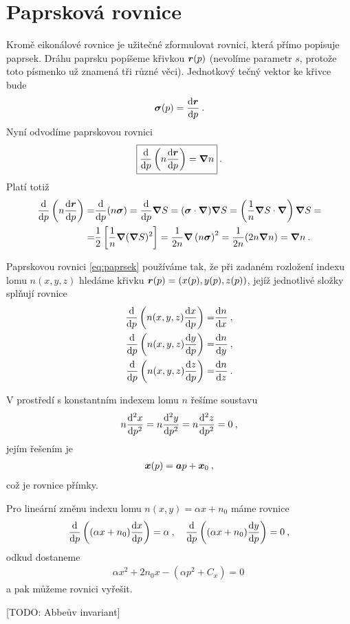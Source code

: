 \section{Paprsková rovnice}

Kromě eikonálové rovnice je užitečné zformulovat rovnici, která přímo popisuje paprsek. Dráhu paprsku popíšeme křivkou $\boldsymbol{r}(p)$ (nevolíme parametr $s$, protože toto písmenko už znamená tři různé věci). Jednotkový tečný vektor ke křivce bude \begin{align}
    \boldsymbol{\sigma}(p) = \dfrac{\mathrm{d}\boldsymbol{r}}{\mathrm{d}p} \:.
\end{align}
Nyní odvodíme paprskovou rovnici
\begin{align}
    \boxed{
    \dfrac{\mathrm{d}}{\mathrm{d}p} \left( n \dfrac{\mathrm{d}\boldsymbol{r}}{\mathrm{d}p}\right)  = \boldsymbol{\nabla} n 
    }\:. \label{eq:paprsek}
\end{align}
Platí totiž
\begin{align}
    \dfrac{\mathrm{d}}{\mathrm{d}p} \left( n \dfrac{\mathrm{d}\boldsymbol{r}}{\mathrm{d}p}\right) 
    =&
    \dfrac{\mathrm{d}}{\mathrm{d}p} (n \boldsymbol{\sigma}) 
    =
    \dfrac{\mathrm{d}}{\mathrm{d}p} \boldsymbol{\nabla} S 
    =
    (\boldsymbol{\sigma} \cdot \boldsymbol{\nabla} ) \boldsymbol{\nabla} S 
    = 
    \left( \frac{1}{n} \boldsymbol{\nabla} S \cdot \boldsymbol{\nabla} \right) \boldsymbol{\nabla} S 
    =\\ =&
    \dfrac{1}{2} \left[ \frac{1}{n} \boldsymbol{\nabla} (\boldsymbol{\nabla} S)^2 \right] 
    =
    \frac{1}{2 n} \boldsymbol{\nabla} \left( n \boldsymbol{\sigma} \right)^2 
    =
    \frac{1}{2n} (2 n \boldsymbol{\nabla} n)= \boldsymbol{\nabla} n \:.
\end{align}

Paprskovou rovnici \eqref{eq:paprsek} používáme tak, že při zadaném rozložení indexu lomu $n(x,y,z)$ hledáme křivku $\boldsymbol{r}(p) = \left( x(p), y(p), z(p) \right)$, jejíž jednotlivé složky splňují rovnice \begin{align}
    \dfrac{\mathrm{d}}{\mathrm{d}p} \left( n(x,y,z) \dfrac{\mathrm{d}x}{\mathrm{d}p} \right) =& \dfrac{\mathrm{d}n}{\mathrm{d}x} \:, \\
    \dfrac{\mathrm{d}}{\mathrm{d}p} \left( n(x,y,z) \dfrac{\mathrm{d}y}{\mathrm{d}p} \right) =& \dfrac{\mathrm{d}n}{\mathrm{d}y} \:, \\
    \dfrac{\mathrm{d}}{\mathrm{d}p} \left( n(x,y,z) \dfrac{\mathrm{d}z}{\mathrm{d}p} \right) =& \dfrac{\mathrm{d}n}{\mathrm{d}z} \:.
\end{align}

\begin{example}
V prostředí s konstantním indexem lomu $n$ řešíme soustavu \begin{align}
    n \dfrac{\mathrm{d}^2 x}{\mathrm{d}p^2} = n \dfrac{\mathrm{d}^2 y}{\mathrm{d}p^2} = n \dfrac{\mathrm{d}^2 z}{\mathrm{d}p^2} = 0 \:, 
\end{align}
jejím řešením je \begin{align}
    \boldsymbol{x}(p) = \boldsymbol{a} p + \boldsymbol{x}_0 \:,
\end{align}
což je rovnice přímky.

Pro lineární změnu indexu lomu $n(x,y) = \alpha x + n_0$ máme rovnice 
\begin{align}
    \dfrac{\mathrm{d}}{\mathrm{d}p} \left( (\alpha x + n_0) \dfrac{\mathrm{d}x}{\mathrm{d}p} \right) = \alpha \:, \quad \dfrac{\mathrm{d}}{\mathrm{d}p} \left( (\alpha x + n_0) \dfrac{\mathrm{d}y}{\mathrm{d}p} \right) = 0 \:,
\end{align}
odkud dostaneme \begin{align}
    \alpha x^2 + 2 n_0 x - (\alpha p^2 + C_x)  = 0 \:
\end{align}
a pak můžeme rovnici vyřešit.
\end{example}

[TODO: Abbeův invariant]